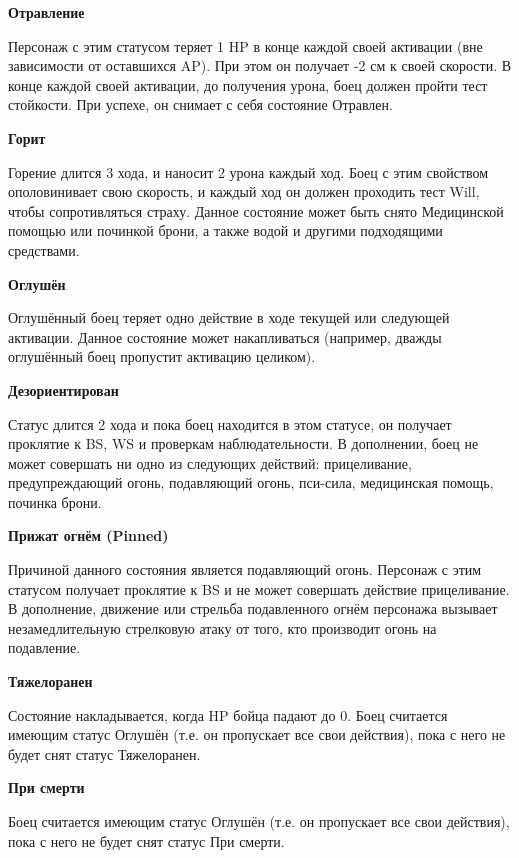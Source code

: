 \begin{multicols}{2}
    \textbf{Отравление}

    Персонаж с этим статусом теряет 1 HP в конце каждой своей активации (вне зависимости от оставшихся AP). При этом он получает -2 см к своей скорости. В конце каждой своей активации, до получения урона, боец должен пройти тест стойкости. При успехе, он снимает с себя состояние Отравлен.

    \textbf{Горит}

    Горение длится 3 хода, и наносит 2 урона каждый ход. Боец с этим свойством ополовинивает свою скорость, и каждый ход он должен проходить тест Will, чтобы сопротивляться страху.
    Данное состояние может быть снято Медицинской помощью или починкой брони, а также водой и другими подходящими средствами.

    \textbf{Оглушён}

    Оглушённый боец теряет одно действие в ходе текущей или следующей активации. Данное состояние может накапливаться (например, дважды оглушённый боец 
    пропустит активацию целиком).

    \textbf{Дезориентирован}

    Статус длится 2 хода и пока боец находится в этом статусе, он получает проклятие к BS, WS и проверкам наблюдательности.
    В дополнении, боец не может совершать ни одно из следующих действий: прицеливание, предупреждающий огонь, подавляющий огонь, пси-сила, медицинская помощь, починка брони.

    \textbf{Прижат огнём (Pinned)}

    Причиной данного состояния является подавляющий огонь. Персонаж с этим статусом получает проклятие к BS и не может совершать 
    действие прицеливание. В дополнение, движение или стрельба подавленного огнём персонажа вызывает незамедлительную стрелковую 
    атаку от того, кто производит огонь на подавление.

    \textbf{Тяжелоранен}
    
    Состояние накладывается, когда HP бойца падают до 0. Боец считается имеющим статус Оглушён (т.е. он пропускает все свои действия), пока с него не будет снят статус Тяжелоранен.

    \textbf{При смерти}

    Боец считается имеющим статус Оглушён (т.е. он пропускает все свои действия), пока с него не будет снят статус При смерти. 
\end{multicols}